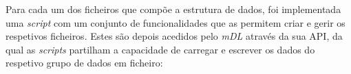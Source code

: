


Para cada um dos ficheiros que compõe a estrutura de dados, foi implementada uma \textit{script} com um conjunto de funcionalidades que as permitem criar e gerir os respetivos ficheiros. Estes são depois acedidos pelo \textit{mDL} através da sua API, da qual as \textit{scripts} partilham a capacidade de carregar e escrever os dados do respetivo grupo de dados em ficheiro:

